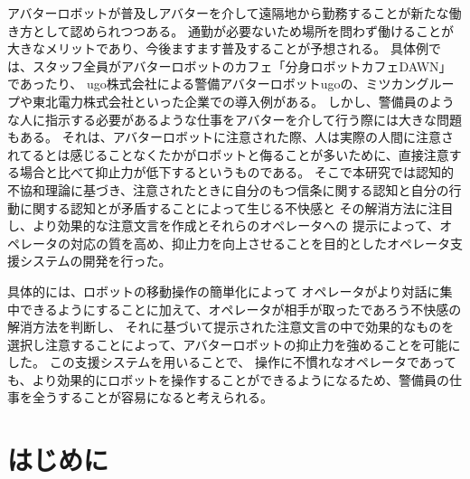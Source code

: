 \documentclass{kuisthesis}
\date{2024年1月31日}
\begin{document}
\maketitle

\begin{jabstract}


アバターロボットが普及しアバターを介して遠隔地から勤務することが新たな働き方として認められつつある。
通勤が必要ないため場所を問わず働けることが
大きなメリットであり、今後ますます普及することが予想される。
具体例では、スタッフ全員がアバターロボットのカフェ「分身ロボットカフェDAWN」\cite{takeuchi2020avatar}であったり、
ugo株式会社による警備アバターロボットugoの、ミツカングループや東北電力株式会社といった企業での導入例がある。
しかし、警備員のような人に指示する必要があるような仕事をアバターを介して行う際には大きな問題もある。
それは、アバターロボットに注意された際、人は実際の人間に注意されてるとは感じることなくたかがロボットと侮ることが多いために、直接注意する場合と比べて抑止力が低下するというものである。
そこで本研究では認知的不協和理論に基づき、注意されたときに自分のもつ信条に関する認知と自分の行動に関する認知とが矛盾することによって生じる不快感と
その解消方法に注目し、より効果的な注意文言を作成とそれらのオペレータへの
提示によって、オペレータの対応の質を高め、抑止力を向上させることを目的としたオペレータ支援システムの開発を行った。

具体的には、ロボットの移動操作の簡単化によって
オペレータがより対話に集中できるようにすることに加えて、オペレータが相手が取ったであろう不快感の解消方法を判断し、
それに基づいて提示された注意文言の中で効果的なものを選択し注意することによって、アバターロボットの抑止力を強めることを可能にした。
この支援システムを用いることで、
操作に不慣れなオペレータであっても、より効果的にロボットを操作することができるようになるため、警備員の仕事を全うすることが容易になると考えられる。
\end{jabstract}


\tableofcontents



\section{はじめに} %
\end{document}
